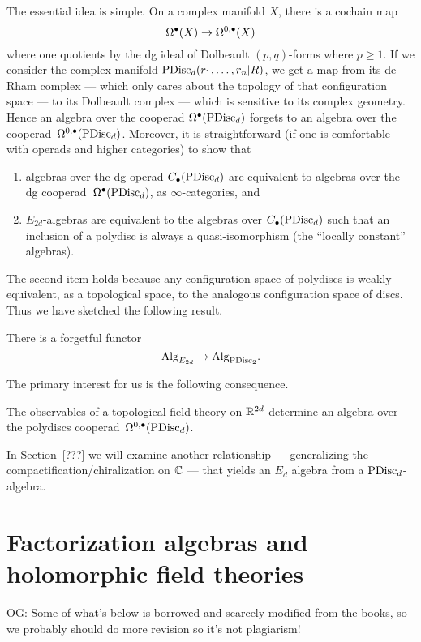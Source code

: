 \documentclass[11pt]{amsart}
\def\owen#1{{\textcolor{violet!50!black}{OG: {#1}}}}
\begin{document}
The essential idea is simple.
On a complex manifold $X$, there is a cochain map
\[
\Omega^\bullet(X) \to \Omega^{0,\bullet}(X)
\]
where one quotients by the dg ideal of Dolbeault $(p,q)$-forms where $p \geq 1$.
If we consider the complex manifold ${\rm PDisc}_d(r_1,\ldots,r_n|R)$, 
we get a map from its de Rham complex --- which only cares about the topology of that configuration space --- to its Dolbeault complex --- which is sensitive to its complex geometry.
Hence an algebra over the cooperad $\Omega^\bullet({\rm PDisc}_d)$ forgets to an algebra over the cooperad~$\Omega^{0,\bullet}({\rm PDisc}_d)$.
Moreover, it is straightforward (if one is comfortable with operads and higher categories) to show that 
\begin{enumerate}
\item algebras over the dg operad $C_\bullet({\rm PDisc}_d)$ are equivalent to algebras over the dg cooperad~$\Omega^\bullet({\rm PDisc}_d)$, as $\infty$-categories, and
\item $E_{2d}$-algebras are equivalent to the algebras over $C_\bullet({\rm PDisc}_d)$ such that an inclusion of a polydisc is always a quasi-isomorphism (the ``locally constant'' algebras).
\end{enumerate}
The second item holds because any configuration space of polydiscs is weakly equivalent, as a topological space, to the analogous configuration space of discs.
Thus we have sketched the following result.

\begin{thm}
There is a forgetful functor
\[
{\rm Alg}_{E_{2d}} \to  {\rm Alg}_{{\rm PDisc}_2}.
\]
\end{thm}

The primary interest for us is the following consequence.

\begin{cor}
The observables of a topological field theory on $\mathbb R^{2d}$ determine an algebra over the polydiscs cooperad~$\Omega^{0,\bullet}({\rm PDisc}_d)$.
\end{cor}

In Section~\ref{???} we will examine another relationship --- generalizing the compactification/chiralization on $\mathbb C$ --- that yields an $E_d$ algebra from a ${\rm PDisc}_d$-algebra.


\section{Factorization algebras and holomorphic field theories}
\label{sec: fact alg}

\owen{Some of what's below is borrowed and scarcely modified from the books, so we probably should do more revision so it's not plagiarism!}
\end{document}
